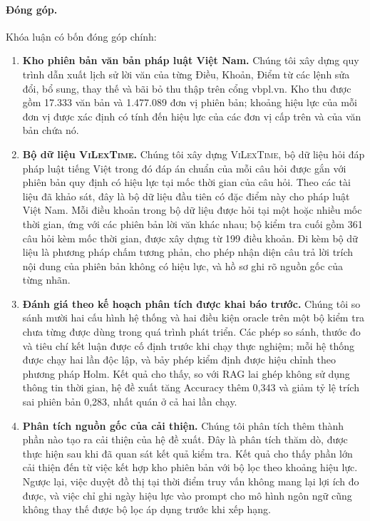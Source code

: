 \documentclass[11pt,a4paper]{article}
\newcommand{\sv}{\textsc{ViLexTime}}
\begin{document}
\paragraph{Đóng góp.} Khóa luận có bốn đóng góp chính:
\begin{enumerate}
  \item \textbf{Kho phiên bản văn bản pháp luật Việt Nam.} Chúng tôi xây dựng quy trình dẫn xuất lịch sử lời văn của từng Điều, Khoản, Điểm từ các lệnh sửa đổi, bổ sung, thay thế và bãi bỏ thu thập trên cổng vbpl.vn. Kho thu được gồm 17.333 văn bản và 1.477.089 đơn vị phiên bản; khoảng hiệu lực của mỗi đơn vị được xác định có tính đến hiệu lực của các đơn vị cấp trên và của văn bản chứa nó.
  \item \textbf{Bộ dữ liệu \sv{}.} Chúng tôi xây dựng \sv{}, bộ dữ liệu hỏi đáp pháp luật tiếng Việt trong đó đáp án chuẩn của mỗi câu hỏi được gắn với phiên bản quy định có hiệu lực tại mốc thời gian của câu hỏi. Theo các tài liệu đã khảo sát, đây là bộ dữ liệu đầu tiên có đặc điểm này cho pháp luật Việt Nam. Mỗi điều khoản trong bộ dữ liệu được hỏi tại một hoặc nhiều mốc thời gian, ứng với các phiên bản lời văn khác nhau; bộ kiểm tra cuối gồm 361 câu hỏi kèm mốc thời gian, được xây dựng từ 199 điều khoản. Đi kèm bộ dữ liệu là phương pháp chấm tương phản, cho phép nhận diện câu trả lời trích nội dung của phiên bản không có hiệu lực, và hồ sơ ghi rõ nguồn gốc của từng nhãn.
  \item \textbf{Đánh giá theo kế hoạch phân tích được khai báo trước.} Chúng tôi so sánh mười hai cấu hình hệ thống và hai điều kiện oracle trên một bộ kiểm tra chưa từng được dùng trong quá trình phát triển. Các phép so sánh, thước đo và tiêu chí kết luận được cố định trước khi chạy thực nghiệm; mỗi hệ thống được chạy hai lần độc lập, và bảy phép kiểm định được hiệu chỉnh theo phương pháp Holm. Kết quả cho thấy, so với RAG lai ghép không sử dụng thông tin thời gian, hệ đề xuất tăng Accuracy thêm 0,343 và giảm tỷ lệ trích sai phiên bản 0,283, nhất quán ở cả hai lần chạy.
  \item \textbf{Phân tích nguồn gốc của cải thiện.} Chúng tôi phân tích thêm thành phần nào tạo ra cải thiện của hệ đề xuất. Đây là phân tích thăm dò, được thực hiện sau khi đã quan sát kết quả kiểm tra. Kết quả cho thấy phần lớn cải thiện đến từ việc kết hợp kho phiên bản với bộ lọc theo khoảng hiệu lực. Ngược lại, việc duyệt đồ thị tại thời điểm truy vấn không mang lại lợi ích đo được, và việc chỉ ghi ngày hiệu lực vào prompt cho mô hình ngôn ngữ cũng không thay thế được bộ lọc áp dụng trước khi xếp hạng.
\end{enumerate}
\end{document}
